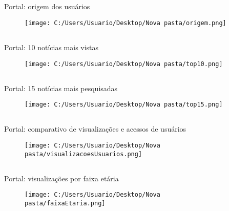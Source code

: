 \documentclass{article}%
\begin{document}
%
\subsection*{}%
\label{subsec:}%
Portal: origem dos usuários%


\begin{figure}[H]%
\centering%
\texttt{[image: C:/Users/Usuario/Desktop/Nova pasta/origem.png]}%
\end{figure}

%
\newpage%
\subsection*{}%
\label{subsec:}%
Portal: 10 notícias mais vistas%


\begin{figure}[H]%
\centering%
\texttt{[image: C:/Users/Usuario/Desktop/Nova pasta/top10.png]}%
\end{figure}

%
\subsection*{}%
\label{subsec:}%
Portal: 15 notícias mais pesquisadas%


\begin{figure}[H]%
\centering%
\texttt{[image: C:/Users/Usuario/Desktop/Nova pasta/top15.png]}%
\end{figure}

%
\subsection*{}%
\label{subsec:}%
Portal: comparativo de visualizações e acessos de usuários%


\begin{figure}[H]%
\centering%
\texttt{[image: C:/Users/Usuario/Desktop/Nova pasta/visualizacoesUsuarios.png]}%
\end{figure}

%
\subsection*{}%
\label{subsec:}%
Portal: visualizações por faixa etária%


\begin{figure}[H]%
\centering%
\texttt{[image: C:/Users/Usuario/Desktop/Nova pasta/faixaEtaria.png]}%
\end{figure}
\end{document}
